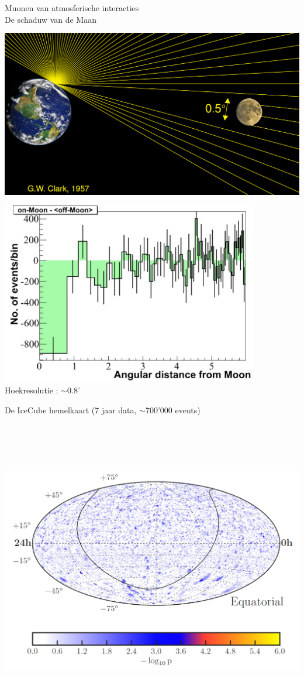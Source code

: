 \Tr
\onecolumn
\begin{center}
{\red Muonen van atmosferische interacties}\\[1cm]
{\blue De schaduw van de Maan}\\[5mm]
\includegraphics[keepaspectratio,height=8cm]{moon-shadow1}
\includegraphics[keepaspectratio,height=8cm]{moon-shadow2}\\[1cm]
{\blue Hoekresolutie : $\sim 0.8^{\circ}$}
\end{center}

\Tr
\onecolumn
\begin{center}
{\blue De IceCube hemelkaart} (7 jaar data, $\sim$700'000 events)\\[5mm]
\includegraphics[keepaspectratio,height=14cm]{icecube-skymap-7years}
\end{center}
